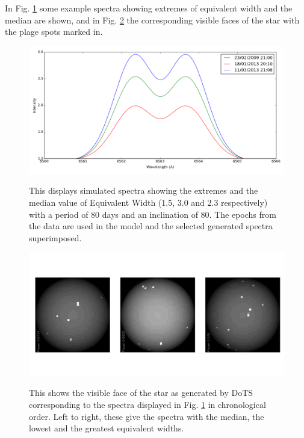 In Fig. \ref{fig:extremew} some example spectra showing extremes of equivalent width and the median  are shown, and in
Fig. \ref{fig:extremewpics} the corresponding visible faces of the star with the plage spots marked in.

\begin{figure}[!htbp]
\begin{center}
\includegraphics[scale=0.40]{Figures/extremes.png} \\
\end{center}
\caption{This displays simulated spectra showing the extremes and the median value of Equivalent Width (1.5, 3.0 and 2.3
  respectively) with a period of 80 days and an inclination of 80\degree. The epochs from the {\harps} data are used in
  the model and the selected generated spectra superimposed.}
\protect\label{fig:extremew}
\end{figure}

\begin{figure}[!htbp]
\begin{center}
\includegraphics[scale=0.18]{Figures/extremeewpics.png} \\
\end{center}
\caption{This shows the visible face of the star as generated by DoTS corresponding to the spectra displayed in
  Fig. \ref{fig:extremew} in chronological order. Left to right, these give the spectra with the median, the lowest and
  the greatest equivalent widths.}
\protect\label{fig:extremewpics}
\end{figure}

